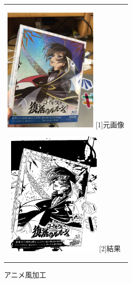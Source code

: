 \documentclass[a4paper,11pt,titlepage]{bxjsarticle}
\begin{document}
\begin{figure}[htbp]
  \begin{center}
    \begin{tabular}{c}
      \begin{minipage}{0.33\hsize}
        \begin{center}
          \includegraphics[clip, width=4.5cm]{./ギアス.jpg}
          \hspace{1.6cm} [1]元画像
        \end{center}
      \end{minipage}

      \begin{minipage}{0.33\hsize}
        \begin{center}
          \includegraphics[clip, width=4.5cm]{./result4.jpg}
          \hspace{1.6cm} [2]結果
        \end{center}
        
      \end{minipage}
       \end{tabular}
    \caption{アニメ風加工}
    \label{fig:lena}
  \end{center}
\end{figure}
\section{}
\section{}
\begin{thebibliography}{99}
\end{thebibliography}
\end{document}
